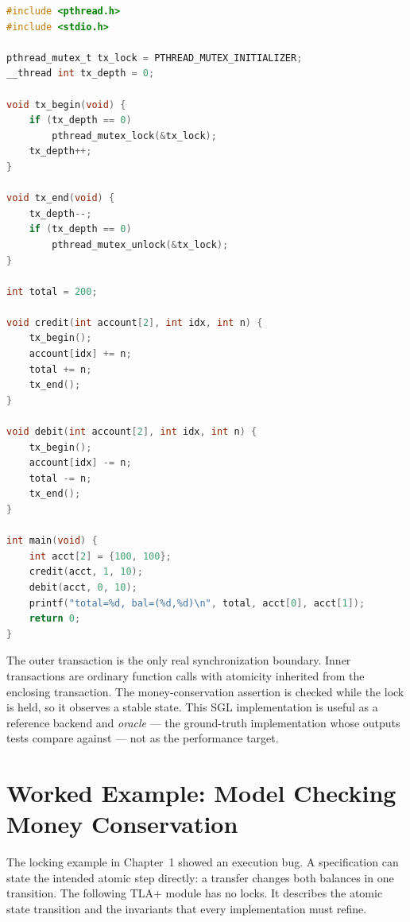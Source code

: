 \begin{lstlisting}[language=C, caption={A compilable flattened transaction
wrapper. Build with \texttt{cc -std=c11 -pthread tx\_flatten.c -o tx\_flatten}.},
label={lst:flatten-bank}]
#include <pthread.h>
#include <stdio.h>

pthread_mutex_t tx_lock = PTHREAD_MUTEX_INITIALIZER;
__thread int tx_depth = 0;

void tx_begin(void) {
    if (tx_depth == 0)
        pthread_mutex_lock(&tx_lock);
    tx_depth++;
}

void tx_end(void) {
    tx_depth--;
    if (tx_depth == 0)
        pthread_mutex_unlock(&tx_lock);
}

int total = 200;

void credit(int account[2], int idx, int n) {
    tx_begin();
    account[idx] += n;
    total += n;
    tx_end();
}

void debit(int account[2], int idx, int n) {
    tx_begin();
    account[idx] -= n;
    total -= n;
    tx_end();
}

int main(void) {
    int acct[2] = {100, 100};
    credit(acct, 1, 10);
    debit(acct, 0, 10);
    printf("total=%d, bal=(%d,%d)\n", total, acct[0], acct[1]);
    return 0;
}
\end{lstlisting}

The outer transaction is the only real synchronization boundary. Inner
transactions are ordinary function calls with atomicity inherited from the
enclosing transaction. The money-conservation assertion is checked while the
lock is held, so it observes a stable state. This SGL implementation is useful
as a reference backend and \emph{oracle} --- the ground-truth implementation
whose outputs tests compare against --- not as the performance target.

\section{Worked Example: Model Checking Money Conservation}

The locking example in Chapter~1 showed an execution bug. A specification can
state the intended atomic step directly: a transfer changes both balances in
one transition. The following TLA+ module has no locks. It describes the
atomic state transition and the invariants that every implementation must
refine.

